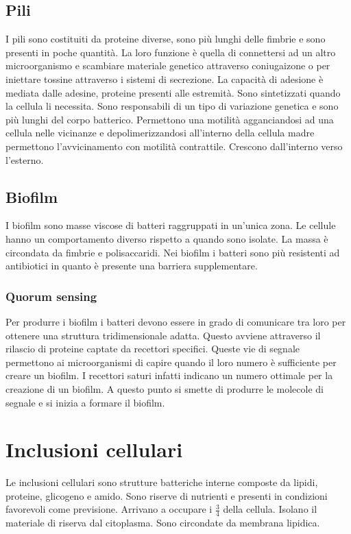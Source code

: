 	\subsection{Pili}
	I pili sono costituiti da proteine diverse, sono pi\`u lunghi delle fimbrie e sono presenti in poche quantit\`a.
	La loro funzione \`e quella di connettersi ad un altro microorganismo e scambiare materiale genetico attraverso coniugaizone o per iniettare tossine attraverso i sistemi di secrezione.
	La capacit\`a di adesione \`e mediata dalle adesine, proteine presenti alle estremit\`a.
	Sono sintetizzati quando la cellula li necessita.
	Sono responsabili di un tipo di variazione genetica e sono pi\`u lunghi del corpo batterico.
	Permettono una motilit\`a agganciandosi ad una cellula nelle vicinanze e depolimerizzandosi all'interno della cellula madre permettono l'avvicinamento con motilit\`a contrattile.
	Crescono dall'interno verso l'esterno.

	\subsection{Biofilm}
	I biofilm sono masse viscose di batteri raggruppati in un'unica zona.
	Le cellule hanno un comportamento diverso rispetto a quando sono isolate.
	La massa \`e circondata da fimbrie e polisaccaridi.
	Nei biofilm i batteri sono pi\`u resistenti ad antibiotici in quanto \`e presente una barriera supplementare.

		\subsubsection{Quorum sensing}
		Per produrre i biofilm i batteri devono essere in grado di comunicare tra loro per ottenere una struttura tridimensionale adatta.
		Questo avviene attraverso il rilascio di proteine captate da recettori specifici.
		Queste vie di segnale permettono ai microorganismi di capire quando il loro numero \`e sufficiente per creare un biofilm.
		I recettori saturi infatti indicano un numero ottimale per la creazione di un biofilm.
		A questo punto si smette di produrre le molecole di segnale e si inizia a formare il biofilm.

\section{Inclusioni cellulari}
Le inclusioni cellulari sono strutture batteriche interne composte da lipidi, proteine, glicogeno e amido.
Sono riserve di nutrienti e presenti in condizioni favorevoli come previsione.
Arrivano a occupare i $\frac{3}{4}$ della cellula.
Isolano il materiale di riserva dal citoplasma.
Sono circondate da membrana lipidica.

